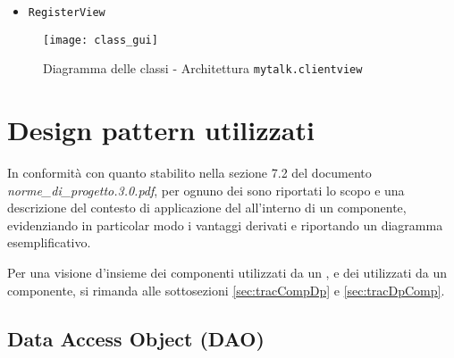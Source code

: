 \begin{itemize}[leftmargin=0em]

\item \texttt{RegisterView}

\end{itemize}

\begin{figure}[H]
  \centering
  \texttt{[image: class\_gui]}
  \caption{Diagramma delle classi - Architettura \texttt{mytalk.clientview}}\label{fig:sottoarchview}
\end{figure}
\clearpage

\section{Design pattern utilizzati}
In conformità con quanto stabilito nella sezione 7.2 del documento \textit{norme\_di\_progetto.3.0.pdf}, per ognuno dei  sono riportati lo scopo e una descrizione del contesto di applicazione del  all'interno di un componente, evidenziando in particolar modo i vantaggi derivati e riportando un diagramma esemplificativo.

Per una visione d'insieme dei componenti utilizzati da un , e dei  utilizzati da un componente, si rimanda alle sottosezioni \vref{sec:tracCompDp} e \vref{sec:tracDpComp}.


\subsection{Data Access Object (DAO)}\label{sec:patterndao}


